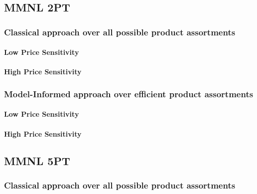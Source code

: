

\subsection{MMNL 2PT}

\subsubsection{Classical approach over all possible product assortments}

\paragraph{Low Price Sensitivity}



\paragraph{High Price Sensitivity}



\subsubsection{Model-Informed approach over efficient product assortments}

\paragraph{Low Price Sensitivity}



\paragraph{High Price Sensitivity}



\subsection{MMNL 5PT}

\subsubsection{Classical approach over all possible product assortments}


